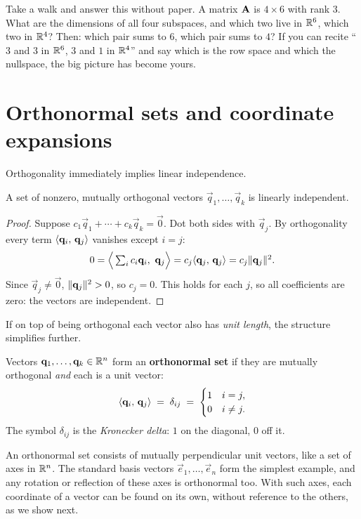 \begin{walkbox}
Take a walk and answer this without paper. A matrix $\mathbf{A}$ is $4\times 6$ with rank $3$. What are
the dimensions of all four subspaces, and which two live in $\mathbb{R}^6$, which two in $\mathbb{R}^4$? Then:
which pair sums to $6$, which pair sums to $4$? If you can recite ``$3$ and $3$ in $\mathbb{R}^6$, $3$ and
$1$ in $\mathbb{R}^4$'' and say which is the row space and which the nullspace, the big picture has become
yours.
\end{walkbox}

\section{Orthonormal sets and coordinate expansions}

Orthogonality immediately implies linear independence.

\begin{proposition}\label{ch17:orthog-implies-indep}
A set of nonzero, mutually orthogonal vectors $\vec{q}_1,\dots,\vec{q}_k$ is linearly independent.
\end{proposition}

\begin{proof}
Suppose $c_1\vec q_1+\cdots+c_k\vec q_k=\vec 0$. Dot both sides with $\vec q_j$. By orthogonality
every term $\langle \mathbf{q}_i,\, \mathbf{q}_j \rangle$ vanishes except $i=j$:
\[
  0 = \Big\langle \textstyle\sum_i c_i\mathbf{q}_i,\ \mathbf{q}_j\Big\rangle
    = c_j\langle \mathbf{q}_j,\, \mathbf{q}_j \rangle = c_j\lVert\mathbf{q}_j\rVert^2.
\]
Since $\vec q_j\neq\vec 0$, $\lVert\mathbf{q}_j\rVert^2>0$, so $c_j=0$. This holds for each $j$, so all
coefficients are zero: the vectors are independent.
\end{proof}

If on top of being orthogonal each vector also has \emph{unit length}, the structure simplifies further.

\begin{definition}\label{ch17:def-orthonormal}
Vectors $\mathbf{q}_1,\dots,\mathbf{q}_k\in\mathbb{R}^n$ form an \textbf{orthonormal set} if they are mutually
orthogonal \emph{and} each is a unit vector:
\[
  \langle \mathbf{q}_i,\, \mathbf{q}_j \rangle \;=\; \delta_{ij} \;=\;
  \begin{cases} 1 & i=j,\\ 0 & i\neq j.\end{cases}
\]
The symbol $\delta_{ij}$ is the \emph{Kronecker delta}: $1$ on the diagonal, $0$ off it.
\end{definition}

\begin{intuitionbox}
An orthonormal set consists of mutually perpendicular unit vectors, like a set of axes in
$\mathbb{R}^n$. The standard basis vectors $\vec{e}_1,\dots,\vec{e}_n$ form the simplest example, and
any rotation or reflection of these axes is orthonormal too. With such axes, each coordinate of a
vector can be found on its own, without reference to the others, as we show next.
\end{intuitionbox}

